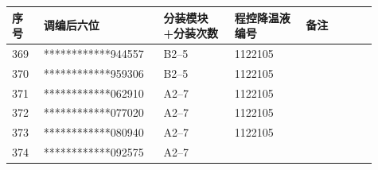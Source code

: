 \documentclass[UTF8,10pt,a4paper,fontset=fandol]{ctexart}
\newcommand{\fieldvalue}[1]{#1}
\begin{document}
\begin{center}
\begin{tabular}{|p{0.08\linewidth}|p{0.29\linewidth}|p{0.18\linewidth}|p{0.18\linewidth}|p{0.18\linewidth}|}
\hline
序号 & 调编后六位 & 分装模块+分装次数 & 程控降温液编号 & 备注 \\
\hline
\fieldvalue{369}
&
\fieldvalue{************944557}
&
\fieldvalue{B2--5}
&
\fieldvalue{1122105}
& \\ \hline
\fieldvalue{370}
&
\fieldvalue{************959306}
&
\fieldvalue{B2--5}
&
\fieldvalue{1122105}
& \\ \hline
\fieldvalue{371}
&
\fieldvalue{************062910}
&
\fieldvalue{A2--7}
&
\fieldvalue{1122105}
& \\ \hline
\fieldvalue{372}
&
\fieldvalue{************077020}
&
\fieldvalue{A2--7}
&
\fieldvalue{1122105}
& \\ \hline
\fieldvalue{373}
&
\fieldvalue{************080940}
&
\fieldvalue{A2--7}
&
\fieldvalue{1122105}
& \\ \hline
\fieldvalue{374}
&
\fieldvalue{************092575}
&
\fieldvalue{A2--7}
&

\end{tabular}
\end{center}
\end{document}
